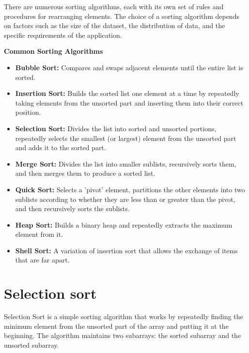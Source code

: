 \documentclass{article}
\begin{document}
There are numerous sorting algorithms, each with its own set of rules and procedures for rearranging elements. The choice of a sorting algorithm depends on factors such as the size of the dataset, the distribution of data, and the specific requirements of the application.

\vspace{0.5cm}

\begin{center}
    \textbf{\fontsize{14}{16}\selectfont Common Sorting Algorithms}
\end{center}

\begin{itemize}
    \item \textbf{Bubble Sort:} Compares and swaps adjacent elements until the entire list is sorted.
    \item \textbf{Insertion Sort:} Builds the sorted list one element at a time by repeatedly taking elements from the unsorted part and inserting them into their correct position.
    \item \textbf{Selection Sort:} Divides the list into sorted and unsorted portions, repeatedly selects the smallest (or largest) element from the unsorted part and adds it to the sorted part.
    \item \textbf{Merge Sort:} Divides the list into smaller sublists, recursively sorts them, and then merges them to produce a sorted list.
    \item \textbf{Quick Sort:} Selects a 'pivot' element, partitions the other elements into two sublists according to whether they are less than or greater than the pivot, and then recursively sorts the sublists.
    \item \textbf{Heap Sort:} Builds a binary heap and repeatedly extracts the maximum element from it.
    \item \textbf{Shell Sort:} A variation of insertion sort that allows the exchange of items that are far apart.
\end{itemize}

 \vspace{1.5cm}
 
\section{Selection sort}
Selection Sort is a simple sorting algorithm that works by repeatedly finding the minimum element from the unsorted part of the array and putting it at the beginning. The algorithm maintains two subarrays: the sorted subarray and the unsorted subarray.
\end{document}
